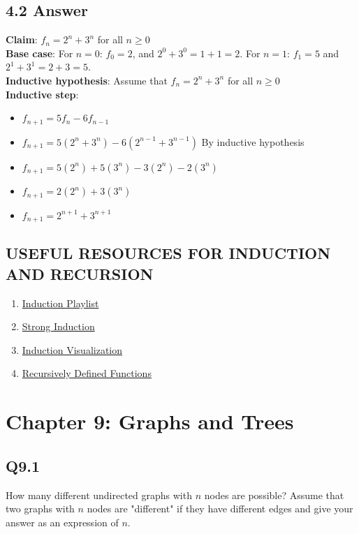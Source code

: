 \documentclass{article}
\begin{document}
\subsection*{4.2 Answer}
\textbf{Claim}: $f_n=2^n+3^n$ for all $n\geq0$
\\ \textbf{Base case}: For $n=0$: $f_0=2$, and $2^0+3^0=1+1=2$. For $n=1$: $f_1=5$ and $2^1+3^1=2+3=5$.
\\ \textbf{Inductive hypothesis}: Assume that $f_n=2^n+3^n$ for all $n\geq0$
\\ \textbf{Inductive step}:
\begin{itemize}[label=]
    \item $f_{n+1}=5f_n-6f_{n-1}$
    \item $f_{n+1}=5(2^n+3^n)-6(2^{n-1}+3^{n-1})$ By inductive hypothesis
    \item $f_{n+1}=5(2^n)+5(3^n)-3(2^n)-2(3^n)$
    \item $f_{n+1}=2(2^n)+3(3^n)$
    \item $f_{n+1}=2^{n+1}+3^{n+1}$
\end{itemize}
\newpage
\subsection*{USEFUL RESOURCES FOR INDUCTION AND RECURSION}
\begin{enumerate}
    \item \href{https://www.youtube.com/watch?v=IdTaA6iz3Mo&list=PL5KkMZvBpo5CnkA4bi7l6W62VPoYRbOEk&index=1}{Induction Playlist}
    \item \href{https://www.youtube.com/watch?v=-vJhahLdmLI}{Strong Induction}
    \item \href{https://www.youtube.com/watch?v=5Hn8vUE3cBQ}{Induction Visualization}
    \item \href{https://www.youtube.com/watch?v=5RB4H_12wOs}{Recursively Defined Functions}
\end{enumerate}
\newpage
\section*{Chapter 9: Graphs and Trees}
\subsection*{Q9.1}
How many different undirected graphs with $n$ nodes are possible? Assume that two graphs with $n$ nodes are "different" if they have different edges and give your answer as an expression of $n$.
\newpage
\end{document}
